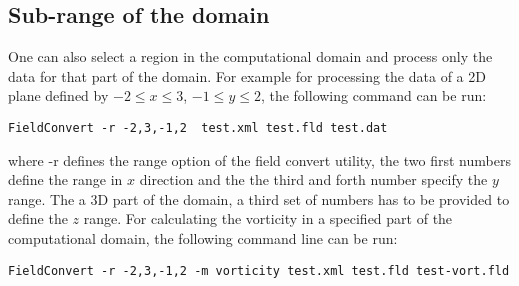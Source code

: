 \subsection{Sub-range of the domain}
One can also select a region in the computational domain and process only the data for that part of the domain. For example for processing the data of a 2D plane defined by $-2\leq x \leq 3$, $-1\leq y \leq 2$, the following command can be run:\\
\begin{lstlisting}[style=BashInputStyle]
FieldConvert -r -2,3,-1,2  test.xml test.fld test.dat
\end{lstlisting}
where -r defines the range option of the field convert utility, the two first numbers define the range in $x$ direction and the the third and forth number specify the $y$ range. The a 3D part of the domain, a third set of numbers has to be provided to define the $z$ range. For calculating the vorticity in a specified part of the computational domain, the following command line can be run:\\
\begin{lstlisting}[style=BashInputStyle]
FieldConvert -r -2,3,-1,2 -m vorticity test.xml test.fld test-vort.fld
\end{lstlisting}
